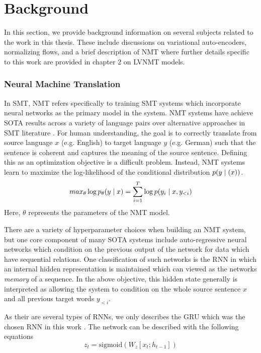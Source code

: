 \chapter{Background}

In this section, we provide background information on several subjects related to the work in this thesis. These include discussions on variational auto-encoders, normalizing flows, and a brief description of \ac{NMT} where further details specific to this work are provided in chapter 2 on \ac{LVNMT} models.  



\subsection{Neural Machine Translation}

In \ac{SMT}, \ac{NMT} refers specifically to training \ac{SMT} systems which incorporate neural networks as the primary model in the system. \ac{NMT} systems have achieve \ac{SOTA} results across a variety of language pairs over alternative approaches in \ac{SMT} literature \cite{bahdanau2014NMTBYJoint,koehn2017NMT,vaswani2017attentionTransformer}. For human understanding, the goal is to correctly translate from source language $x$ (e.g. English) to target language $y$ (e.g. German) such that the sentence is coherent and captures the meaning of the source sentence. Defining this as an optimization  objective is a difficult problem. Instead, \ac{NMT} systems learn to maximize the log-likelihood of the conditional distribution $p(y\; | \;(x))$. 
\begin{equation}
	max_{\theta} \log p_{\theta}(y \; | \;{x})  = \sum_{i=1}^{T} \log p(y_{i} \; | \;{x, y_{<i}})
\end{equation}
Here, $\theta$ represents the parameters of the \ac{NMT} model. 

There are a variety of hyperparameter choices when building an \ac{NMT} system, but one core component of many \ac{SOTA} systems include auto-regressive neural networks which condition on the previous output of the network for data which have sequential relations. One classification of such networks is the \ac{RNN} in which an internal hidden representation is maintained which can viewed as the networks \textit{memory} of a sequence. In the above objective, this hidden state generally is interpreted as allowing the system to condition on the whole source sentence $x$ and all previous target words $y_{<i}$.

As their are several types of \ac{RNN}s, we only describes the \ac{GRU} which was the chosen \ac{RNN} in this work \cite{cho2014GRU}. The network can be described with the following equations
\begin{equation}
	z_{t} = \text{sigmoid}(W_{z}[x_{t}; h_{t-1} ] ) %
\end{equation}

